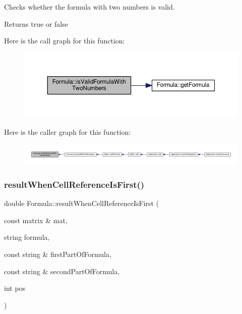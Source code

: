 Checks whether the formula with two numbers is valid. \begin{DoxyReturn}{Returns}
true or false 
\end{DoxyReturn}
Here is the call graph for this function\+:\nopagebreak
\begin{figure}[H]
\begin{center}
\leavevmode
\includegraphics[width=350pt]{class_formula_a0a2b13b0f741ea650e1ae71269dde9a5_cgraph}
\end{center}
\end{figure}
Here is the caller graph for this function\+:\nopagebreak
\begin{figure}[H]
\begin{center}
\leavevmode
\includegraphics[width=350pt]{class_formula_a0a2b13b0f741ea650e1ae71269dde9a5_icgraph}
\end{center}
\end{figure}
\mbox{\label{class_formula_a9a27ccdd3ee3143b1f6e541ec3c6a0ec}} 
\subsubsection{\texorpdfstring{result\+When\+Cell\+Reference\+Is\+First()}{resultWhenCellReferenceIsFirst()}}
{\footnotesize\ttfamily double Formula\+::result\+When\+Cell\+Reference\+Is\+First (\begin{DoxyParamCaption}\item[{const matrix \&}]{mat,  }\item[{string}]{formula,  }\item[{const string \&}]{first\+Part\+Of\+Formula,  }\item[{const string \&}]{second\+Part\+Of\+Formula,  }\item[{int}]{pos }\end{DoxyParamCaption})\hspace{0.3cm}{\ttfamily [private]}}

